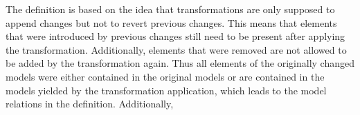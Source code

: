 The definition is based on the idea that transformations are only supposed to append changes but not to revert previous changes.
This means that elements that were introduced by previous changes still need to be present after applying the transformation.
Additionally, elements that were removed are not allowed to be added by the transformation again.
Thus all elements of the originally changed models were either contained in the original models or are contained in the models yielded by the transformation application, which leads to the model relations in the definition.
Additionally, 


